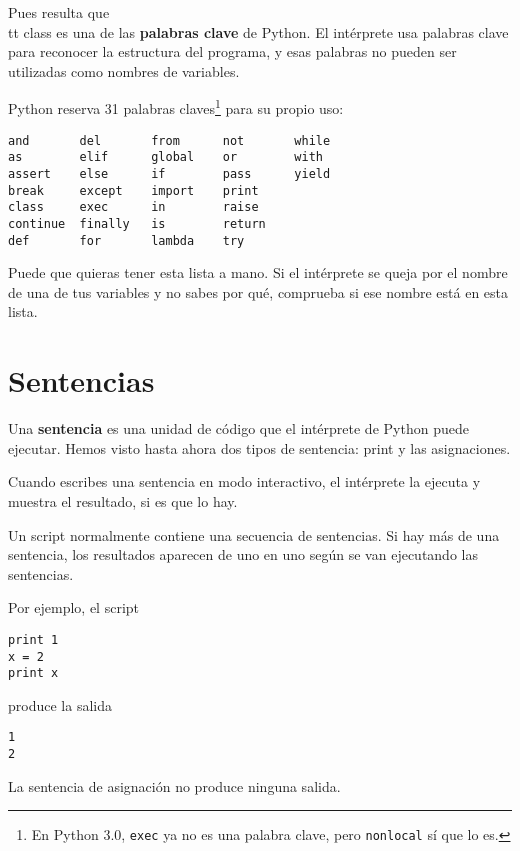 Pues resulta que {\\tt class} es una de las {\bf palabras clave} de Python. El
intérprete usa palabras clave para reconocer la estructura del programa,
y esas palabras no pueden ser utilizadas como nombres de variables.


Python reserva 31 palabras claves\footnote{En Python 3.0, {\tt exec} ya no es
una palabra clave, pero {\tt nonlocal} sí que lo es.} para su propio uso:

\beforeverb
\begin{verbatim}
and       del       from      not       while    
as        elif      global    or        with     
assert    else      if        pass      yield    
break     except    import    print              
class     exec      in        raise              
continue  finally   is        return             
def       for       lambda    try
\end{verbatim}
\afterverb
%
Puede que quieras tener esta lista a mano. Si el intérprete se queja
por el nombre de una de tus variables y no sabes por qué, comprueba
si ese nombre está en esta lista.

\section{Sentencias}

Una {\bf sentencia} es una unidad de código que el intérprete de Python puede
ejecutar. Hemos visto hasta ahora dos tipos de sentencia: print
y las asignaciones.


Cuando escribes una sentencia en modo interactivo, el intérprete la
ejecuta y muestra el resultado, si es que lo hay.

Un script normalmente contiene una secuencia de sentencias. Si hay
más de una sentencia, los resultados aparecen de uno en uno
según se van ejecutando las sentencias.

Por ejemplo, el script

\beforeverb
\begin{verbatim}
print 1
x = 2
print x
\end{verbatim}
\afterverb
%
produce la salida

\beforeverb
\begin{verbatim}
1
2
\end{verbatim}
\afterverb
%
La sentencia de asignación no produce ninguna salida.


